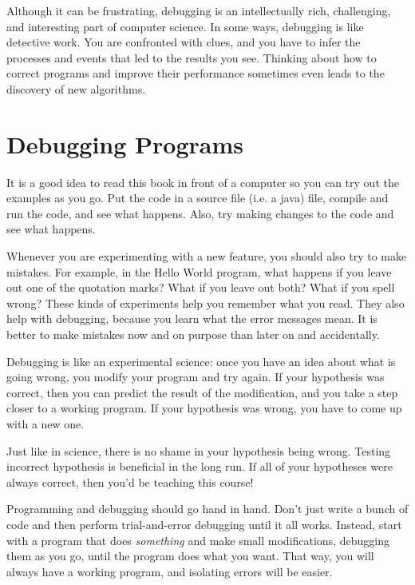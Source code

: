 Although it can be frustrating, debugging is an intellectually rich, challenging, and interesting part of computer science.
In some ways, debugging is like detective work.
You are confronted with clues, and you have to infer the processes and events that led to the results you see.
Thinking about how to correct programs and improve their performance sometimes even leads to the discovery of new algorithms.


\section{Debugging Programs}
\label{sec:examples}

It is a good idea to read this book in front of a computer so you can try out the examples as you go.
Put the code in a source file (i.e. a java) file, compile and run the code, and see what happens.
Also, try making changes to the code and see what happens.


Whenever you are experimenting with a new feature, you should also try to make mistakes.
For example, in the Hello World program, what happens if you leave out one of the quotation marks?
What if you leave out both?
What if you spell  wrong?
These kinds of experiments help you remember what you read.
They also help with debugging, because you learn what the error messages mean.
It is better to make mistakes now and on purpose than later on and accidentally.



Debugging is like an experimental science: once you have an idea about what is going wrong, you modify your program and try again.
If your hypothesis was correct, then you can predict the result of the modification, and you take a step closer to a working program.
If your hypothesis was wrong, you have to come up with a new one.

Just like in science, there is no shame in your hypothesis being wrong. Testing incorrect hypothesis is beneficial in the long run. If all of your hypotheses were always correct, then you'd be teaching this course!

Programming and debugging should go hand in hand.
Don't just write a bunch of code and then perform trial-and-error debugging until it all works.
Instead, start with a program that does {\em something} and make small modifications, debugging them as you go, until the program does what you want.
That way, you will always have a working program, and isolating errors will be easier.

